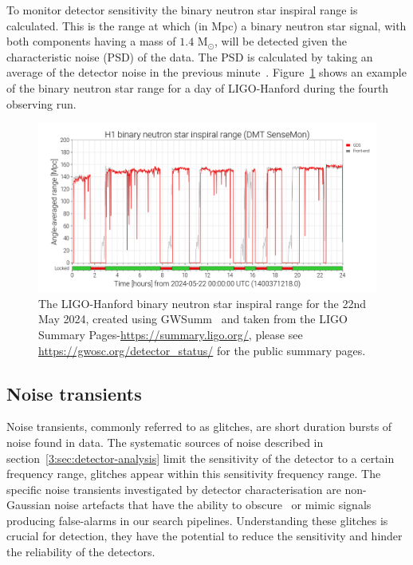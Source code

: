To monitor detector sensitivity the binary neutron star inspiral range is calculated. This is the range at which (in Mpc) a binary neutron star signal, with both components having a mass of $1.4$ M$_{\odot}$, will be detected given the characteristic noise (PSD) of the data. The PSD is calculated by taking an average of the detector noise in the previous minute~\cite{range_calculation:2003, ota:2023}. Figure~\ref{3:fig:bns_range} shows an example of the binary neutron star range for a day of LIGO-Hanford during the fourth observing run.
%
\begin{figure}
    \centering
    \includegraphics[width=1\linewidth]{images/3_detector_characterisation/may22_bns_range.png}
    \caption{The LIGO-Hanford binary neutron star inspiral range for the 22nd May 2024, created using GWSumm~\cite{gwsumm:2024} and taken from the LIGO Summary Pages-\href{https://summary.ligo.org/}{https://summary.ligo.org/}, please see \href{https://gwosc.org/detector_status/}{https://gwosc.org/detector\_status/} for the public summary pages.}
    \label{3:fig:bns_range}
\end{figure}
%

\subsection{\label{3:sec:noise-transients}Noise transients}


Noise transients, commonly referred to as glitches, are short duration bursts of noise found in \gwadj data. The systematic sources of noise described in section~\ref{3:sec:detector-analysis} limit the sensitivity of the detector to a certain frequency range, glitches appear within this sensitivity frequency range. The specific noise transients investigated by detector characterisation are non-Gaussian noise artefacts that have the ability to obscure~\cite{GW170817:2017} or mimic \gwadj signals~\cite{GWMimicking:2010} producing false-alarms in our \gwadj search pipelines. Understanding these glitches is crucial for \gwadj detection, they have the potential to reduce the sensitivity and hinder the reliability of the detectors.
%
%

